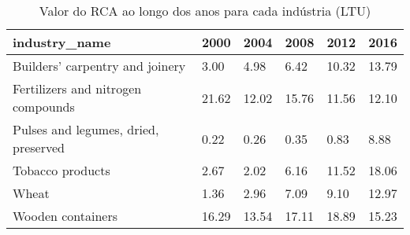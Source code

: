 \begin{table}
\centering
\caption{Valor do RCA ao longo dos anos para cada indústria (LTU)}
\begin{tabular}{p{6cm}p{1.5cm}p{1.5cm}p{1.5cm}p{1.5cm}p{1.5cm}}
\toprule
                       industry\_name &  2000 &  2004 &  2008 &  2012 &  2016 \\
\midrule
     Builders' carpentry and joinery &  3.00 &  4.98 &  6.42 & 10.32 & 13.79 \\
  Fertilizers and nitrogen compounds & 21.62 & 12.02 & 15.76 & 11.56 & 12.10 \\
Pulses and legumes, dried, preserved &  0.22 &  0.26 &  0.35 &  0.83 &  8.88 \\
                    Tobacco products &  2.67 &  2.02 &  6.16 & 11.52 & 18.06 \\
                               Wheat &  1.36 &  2.96 &  7.09 &  9.10 & 12.97 \\
                   Wooden containers & 16.29 & 13.54 & 17.11 & 18.89 & 15.23 \\
\bottomrule
\end{tabular}
\end{table}
